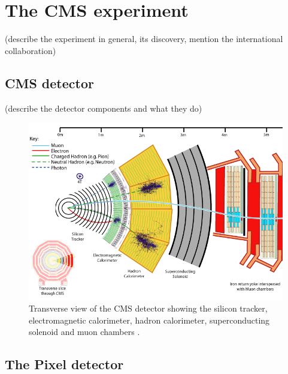 \section{The CMS experiment}
\label{sec:cms}
(describe the experiment in general, its discovery, mention the international collaboration)


\subsection{CMS detector}
(describe the detector components and what they do)


\begin{figure}[H]
  \centering
  \includegraphics[width=0.6\columnwidth]{./cms12.png}
  \caption{Transverse view of the CMS detector showing the silicon tracker, electromagnetic calorimeter, hadron calorimeter, superconducting solenoid and muon chambers \cite{Chatrchyan:2008aa}.}
  \label{fig:CMS}
\end{figure}


\subsection{The Pixel detector}

